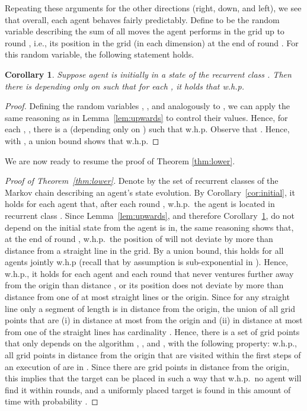 \documentclass[11pt]{article}
\newtheorem{corollary}[theorem]{Corollary}
\begin{document}
Repeating these arguments for the other directions (right, down, and left), we see that overall, each agent behaves fairly predictably. Define  to be the random variable describing the sum of all moves the agent performs in the grid up to round , i.e., its position in the grid (in each dimension) at the end of round . For this random variable, the following statement holds.
\begin{corollary}\label{cor:concentration}
	Suppose agent  is initially in a state of the recurrent class . Then there is  depending only on  such that for each , it holds that  w.h.p.
\end{corollary}

\begin{proof}
Defining the random variables , , and  analogously to , we can apply the same reasoning as in Lemma~\ref{lem:upwards} to control their values. Hence, for each , , there is a  (depending only on ) such that  w.h.p. Observe that . Hence, with , a union bound shows that  w.h.p.
\end{proof}


We are now ready to resume the proof of Theorem \ref{thm:lower}.
\begin{proof}[Proof of Theorem~\ref{thm:lower}]
Denote by  the set of recurrent classes of the Markov chain describing an agent's state evolution. By Corollary~\ref{cor:initial}, it holds for each agent  that, after each round , w.h.p.\ the agent is located in recurrent class . Since Lemma~\ref{lem:upwards}, and therefore Corollary~\ref{cor:concentration}, do not depend on the initial state from  the agent is in, the same reasoning shows that, at the end of round , w.h.p.\ the position of  will not deviate by more than distance  from a straight line in the grid. By a union bound, this holds for all agents jointly w.h.p (recall that by assumption  is sub-exponential in ). Hence, w.h.p., it holds for each agent  and each round  that  never ventures further away from the origin than distance , or its position does not deviate by more than distance  from one of at most  straight lines or the origin. Since for any straight line only a segment of length  is in distance  from the origin, the union of all grid points that are (i) in distance at most  from the origin and (ii) in distance at most  from one of the straight lines has cardinality . Hence, there is a set  of  grid points that only depends on the algorithm , , and , with the following property: w.h.p., all grid points in distance  from the origin that are visited within the first  steps of an execution of  are in . Since there are  grid points in distance  from the origin, this implies that the target can be placed in such a way that w.h.p.\ no agent will find it within  rounds, and a uniformly placed target is found in this amount of time with probability .
\end{proof}
\end{document}
